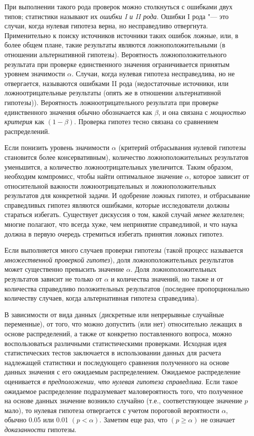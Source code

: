 При выполнении такого рода проверок можно столкнуться с ошибками двух типов; статистики называют их 
\textit{ошибки I и II рода}. Ошибки I рода "--- это случаи, когда нулевая гипотеза верна, но несправедливо 
отвергнута. Применительно к поиску источников источники таких ошибок ложные, или, в более общем плане, такие 
результаты являются ложноположительными (в отношении альтернативной гипотезы). Вероятность ложноположительного 
результата при проверке единственного значения ограничивается принятым уровнем значимости $\alpha$. Случаи, когда 
нулевая гипотеза несправедлива, но не отвергается, называются ошибками II рода (недостаточные источники, или 
ложноотрицательные результаты (опять же в отношении альтернативной гипотезы)). Вероятность ложноотрицательного 
результата при проверке единственного значения обычно обозначается как $\beta$, и она связана с 
\textit{мощностью критерия} как $(1-\beta)$. Проверка гипотез тесно связана со сравнением распределений.

Если понизить уровень значимости $\alpha$ (критерий отбрасывания нулевой гипотезы становится более консервативным), 
количество ложноположительных результатов уменьшится, а количество ложноотрицательных увеличится. Таким образом, 
необходим компромисс, чтобы найти оптимальное значение $\alpha$, которое зависит от относительной важности 
ложноотрицательных и ложноположительных результатов для конкретной задачи. И одобрение ложных гипотез, и отбрасывание 
справедливых гипотез являются ошибками, которые исследователи должны стараться избегать. Существует дискуссия о том, 
какой случай \textit{менее} желателен; многие полагают, что всегда хуже, чем непринятие справедливой, и что наука 
должна в первую очередь стремиться избегать принятия ложных гипотез.

Если выполняется много случаев проверки гипотезы (такой процесс называется \textit{множественной проверкой гипотез}), 
доля ложноположительных результатов может существенно превысить значение $\alpha$. Доля ложноположительных результатов 
зависит не только от $\alpha$ и количества значений, но также и от количества справедливо положительных результатов 
(последнее пропорционально количеству случаев, когда альтернативная гипотеза справедлива). 

В зависимости от вида данных (дискретные или непрерывные случайные переменные), от того, что можно допустить (или нет) 
относительно лежащих в основе распределений, а также от конкретно поставленного вопроса, можно воспользоваться 
различными статистическими проверками. Исходная идея статистических тестов заключается в использовании данных для 
расчета надлежащей статистики и последующего сравнения полученного на основе данных значения с его ожидаемым 
распределением. Ожидаемое распределение оценивается \textit{в предположении, что нулевая гипотеза справедлива}. 
Если такое ожидаемое распределение подразумевает маловероятность того, что полученное на основе данных значение 
возникло случайно (т.е., соответствующее значение $p$ мало), то нулевая гипотеза отвергается с учетом пороговой 
вероятности $\alpha$, обычно 0.05 или 0.01 $(p < \alpha)$. Заметим еще раз, что $(p \geq \alpha)$ не означает 
\textit{доказанности} гипотезы.

